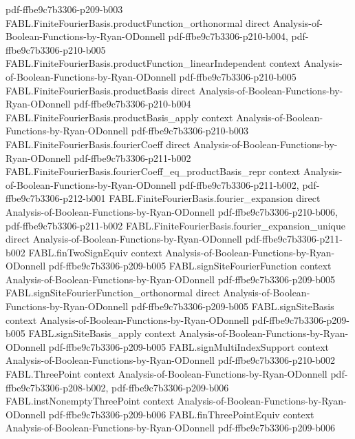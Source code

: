 \begin{theorem}
  {pdf-ffbe9c7b3306-p209-b003}
\proofstep
  {FABL.FiniteFourierBasis.productFunction_orthonormal}
  {direct}
  {Analysis-of-Boolean-Functions-by-Ryan-ODonnell}
  {pdf-ffbe9c7b3306-p210-b004,
    pdf-ffbe9c7b3306-p210-b005}
\proofstep
  {FABL.FiniteFourierBasis.productFunction_linearIndependent}
  {context}
  {Analysis-of-Boolean-Functions-by-Ryan-ODonnell}
  {pdf-ffbe9c7b3306-p210-b005}
\proofstep
  {FABL.FiniteFourierBasis.productBasis}
  {direct}
  {Analysis-of-Boolean-Functions-by-Ryan-ODonnell}
  {pdf-ffbe9c7b3306-p210-b004}
\proofstep
  {FABL.FiniteFourierBasis.productBasis_apply}
  {context}
  {Analysis-of-Boolean-Functions-by-Ryan-ODonnell}
  {pdf-ffbe9c7b3306-p210-b003}
\proofstep
  {FABL.FiniteFourierBasis.fourierCoeff}
  {direct}
  {Analysis-of-Boolean-Functions-by-Ryan-ODonnell}
  {pdf-ffbe9c7b3306-p211-b002}
\proofstep
  {FABL.FiniteFourierBasis.fourierCoeff_eq_productBasis_repr}
  {context}
  {Analysis-of-Boolean-Functions-by-Ryan-ODonnell}
  {pdf-ffbe9c7b3306-p211-b002,
    pdf-ffbe9c7b3306-p212-b001}
\proofstep
  {FABL.FiniteFourierBasis.fourier_expansion}
  {direct}
  {Analysis-of-Boolean-Functions-by-Ryan-ODonnell}
  {pdf-ffbe9c7b3306-p210-b006,
    pdf-ffbe9c7b3306-p211-b002}
\proofstep
  {FABL.FiniteFourierBasis.fourier_expansion_unique}
  {direct}
  {Analysis-of-Boolean-Functions-by-Ryan-ODonnell}
  {pdf-ffbe9c7b3306-p211-b002}
\proofstep
  {FABL.finTwoSignEquiv}
  {context}
  {Analysis-of-Boolean-Functions-by-Ryan-ODonnell}
  {pdf-ffbe9c7b3306-p209-b005}
\proofstep
  {FABL.signSiteFourierFunction}
  {context}
  {Analysis-of-Boolean-Functions-by-Ryan-ODonnell}
  {pdf-ffbe9c7b3306-p209-b005}
\proofstep
  {FABL.signSiteFourierFunction_orthonormal}
  {direct}
  {Analysis-of-Boolean-Functions-by-Ryan-ODonnell}
  {pdf-ffbe9c7b3306-p209-b005}
\proofstep
  {FABL.signSiteBasis}
  {context}
  {Analysis-of-Boolean-Functions-by-Ryan-ODonnell}
  {pdf-ffbe9c7b3306-p209-b005}
\proofstep
  {FABL.signSiteBasis_apply}
  {context}
  {Analysis-of-Boolean-Functions-by-Ryan-ODonnell}
  {pdf-ffbe9c7b3306-p209-b005}
\proofstep
  {FABL.signMultiIndexSupport}
  {context}
  {Analysis-of-Boolean-Functions-by-Ryan-ODonnell}
  {pdf-ffbe9c7b3306-p210-b002}
\proofstep
  {FABL.ThreePoint}
  {context}
  {Analysis-of-Boolean-Functions-by-Ryan-ODonnell}
  {pdf-ffbe9c7b3306-p208-b002,
    pdf-ffbe9c7b3306-p209-b006}
\proofstep
  {FABL.instNonemptyThreePoint}
  {context}
  {Analysis-of-Boolean-Functions-by-Ryan-ODonnell}
  {pdf-ffbe9c7b3306-p209-b006}
\proofstep
  {FABL.finThreePointEquiv}
  {context}
  {Analysis-of-Boolean-Functions-by-Ryan-ODonnell}
  {pdf-ffbe9c7b3306-p209-b006}

\end{theorem}
